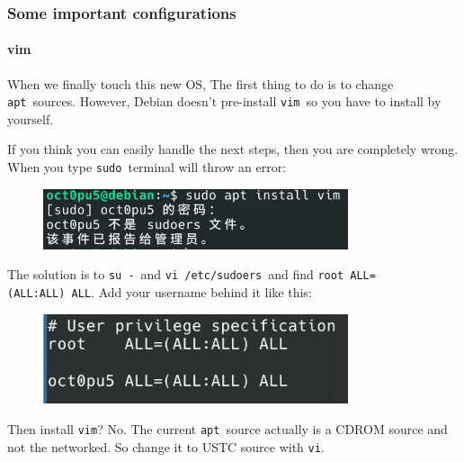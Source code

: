 \documentclass[12pt]{ctexart}
\begin{document}
\subsubsection*{\textbf{Some important configurations}}

\paragraph{\textbf{vim}}\par
\vspace{1em}
When we finally touch this new OS, The first thing to do is to change
\texttt{apt}\ sources. However, Debian doesn't
pre-install \texttt{vim}\ so you have to install by yourself.

If you think you can easily handle the next steps, then you are
completely wrong. When you type \texttt{sudo}\ terminal will throw an
error:

\begin{figure}[H]
    \centering
    \includegraphics[width=0.8\textwidth,keepaspectratio]{assets/Linux/3.1 Seek common ground while reserving differences/9.png}
\end{figure}

The solution is to \texttt{su\ -}\ and \texttt{vi\ /etc/sudoers}\ and find
\texttt{root\ ALL=(ALL:ALL)\ ALL}. Add your username behind it like
this:

\begin{figure}[H]
    \centering
    \includegraphics[width=0.8\textwidth,keepaspectratio]{assets/Linux/3.1 Seek common ground while reserving differences/10.png}
\end{figure}

Then install \texttt{vim}? No. The current \texttt{apt}\ source actually
is a CDROM source and not the networked. So change it to USTC source
with \texttt{vi}.
\end{document}
